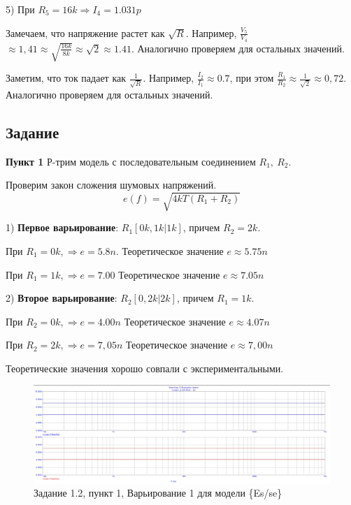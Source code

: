 \documentclass[a4paper, 14pt]{extarticle}%
\begin{document}
5) При $R_5 = 16k \Rightarrow  I_4 = 1.031p$


Замечаем, что напряжение растет как $\sqrt{R}$.
Например, $\frac{V_5}{V_4}$ $\approx 1,41 \approx \sqrt{\frac{16k}{8k}} \approx \sqrt{2} \approx 1.41$. Аналогично проверяем для остальных значений.


Заметим, что ток падает как $\frac{1}{\sqrt{R}}$.
Например, $\frac{I_2}{I_1} \approx 0.7$, при этом $\frac{R_1}{R_2} \approx \frac{1}{\sqrt{2}} \approx 0,72$. Аналогично проверяем для остальных значений.


\subsection{Задание}

\textbf{Пункт 1}
Р-трим модель с последовательным соединением $R_1, \: R_2$.

Проверим закон сложения шумовых напряжений.
\[ e(f) = \sqrt{4kT(R_1 + R_2)} \]

1) \textbf{Первое варьирование}: $R_1[0k, 1k | 1k]$, причем $R_2 = 2k$.

При $R_1 = 0k, \Rightarrow  e = 5.8n$.
Теоретическое значение $e \approx 5.75n$

При $R_1 = 1k, \Rightarrow  e = 7.00$
Теоретическое значение $e \approx 7.05n$

2) \textbf{Второе варьирование}: $R_2[0, 2k | 2k]$, причем $R_1 = 1k$.

При $R_2 = 0k, \Rightarrow  e = 4.00n$
Теоретическое значение $e \approx 4.07n$

При $R_2 = 2k, \Rightarrow  e = 7,05n$
Теоретическое значение $e \approx 7,00n$

Теоретические значения хорошо совпали с экспериментальными.

\begin{figure}[h!]
			\centering
			\includegraphics[width=1.1\linewidth]{1.2/pic4.jpg}
			\caption{Задание 1.2, пункт 1, Варьирование 1 для модели \{Es/se\}}
			\label{A}
\end{figure}
\end{document}
